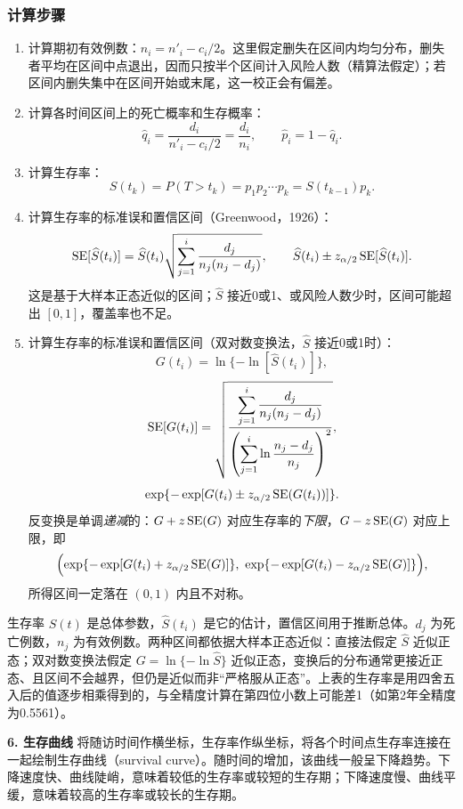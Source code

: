 \subsubsection{计算步骤}
\begin{enumerate}
\item 计算期初有效例数：$n_i=n'_i-c_i/2$。这里假定删失在区间内均匀分布，删失者平均在区间中点退出，因而只按半个区间计入风险人数（精算法假定）；若区间内删失集中在区间开始或末尾，这一校正会有偏差。
\item 计算各时间区间上的死亡概率和生存概率：
\[
\widehat q_i=\frac{d_i}{n'_i-c_i/2}=\frac{d_i}{n_i},\qquad \widehat p_i=1-\widehat q_i.
\]
\item 计算生存率：
\[
S(t_k)=P(T>t_k)=p_1p_2\cdots p_k=S(t_{k-1})p_k.
\]
\item 计算生存率的标准误和置信区间（Greenwood，1926）：
\[
\operatorname{SE}[\widehat S(t_i)]=\widehat S(t_i)\sqrt{\sum_{j=1}^i\frac{d_j}{n_j(n_j-d_j)}},\qquad
\widehat S(t_i)\pm z_{\alpha/2}\operatorname{SE}[\widehat S(t_i)].
\]
这是基于大样本正态近似的区间；$\widehat S$ 接近0或1、或风险人数少时，区间可能超出 $[0,1]$，覆盖率也不足。
\item 计算生存率的标准误和置信区间（双对数变换法，$\widehat S$ 接近0或1时）：
\[
G(t_i)=\ln\{-\ln[\widehat S(t_i)]\},
\]
\[
\operatorname{SE}[G(t_i)]=\sqrt{\frac{\displaystyle\sum_{j=1}^i\frac{d_j}{n_j(n_j-d_j)}}
 {\displaystyle\left(\sum_{j=1}^i\ln\frac{n_j-d_j}{n_j}\right)^2}},
\]
\[
\exp\{-\exp[G(t_i)\pm z_{\alpha/2}\operatorname{SE}(G(t_i))]\}.
\]
反变换是单调\emph{递减}的：$G+z\operatorname{SE}(G)$ 对应生存率的\emph{下限}，$G-z\operatorname{SE}(G)$ 对应上限，即
\[
\Bigl(\exp\{-\exp[G(t_i)+z_{\alpha/2}\SE(G)]\},\ \exp\{-\exp[G(t_i)-z_{\alpha/2}\SE(G)]\}\Bigr),
\]
所得区间一定落在 $(0,1)$ 内且不对称。
\end{enumerate}
\begin{annotation}
生存率 $S(t)$ 是总体参数，$\widehat S(t_i)$ 是它的估计，置信区间用于推断总体。$d_j$ 为死亡例数，$n_j$ 为有效例数。两种区间都依据大样本正态近似：直接法假定 $\widehat S$ 近似正态；双对数变换法假定 $G=\ln\{-\ln\widehat S\}$ 近似正态，变换后的分布通常更接近正态、且区间不会越界，但仍是近似而非“严格服从正态”。上表的生存率是用四舍五入后的值逐步相乘得到的，与全精度计算在第四位小数上可能差1（如第2年全精度为0.5561）。
\end{annotation}
\textbf{6. 生存曲线} 将随访时间作横坐标，生存率作纵坐标，将各个时间点生存率连接在一起绘制生存曲线（survival curve）。随时间的增加，该曲线一般呈下降趋势。下降速度快、曲线陡峭，意味着较低的生存率或较短的生存期；下降速度慢、曲线平缓，意味着较高的生存率或较长的生存期。

